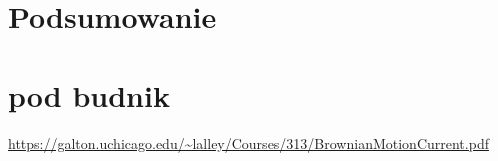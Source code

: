 \documentclass[12pt]{mwart}
\begin{document}
	
	\section{Podsumowanie}
	
	
	
	
	\section{pod budnik}
	
	\newpage
	\begin{thebibliography}{1}
		\url{}
		
		\url{https://galton.uchicago.edu/~lalley/Courses/313/BrownianMotionCurrent.pdf}
	\end{thebibliography}
\end{document}
